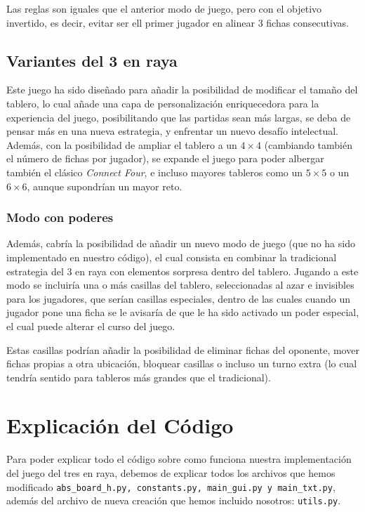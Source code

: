 \documentclass[a4paper,12pt]{article}
\begin{document}
\vspace{\baselineskip}
Las reglas son iguales que el anterior modo de juego, pero con el objetivo invertido, es decir, evitar ser ell primer jugador en alinear 3 fichas consecutivas.

\subsection{Variantes del 3 en raya}
Este juego ha sido diseñado para añadir la posibilidad de modificar el tamaño del tablero, lo cual añade una capa de personalización enriquecedora para la experiencia
del juego, posibilitando que las partidas sean más largas, se deba de pensar más en una nueva estrategia, y enfrentar un nuevo desafío intelectual.
\vspace{\baselineskip}
Además, con la posibilidad de ampliar el tablero a un $4 \times 4$ (cambiando también el número de fichas por jugador), se expande el juego para poder albergar también 
el clásico \textit{Connect Four}, e incluso mayores tableros como un $5 \times 5$ o un $6 \times 6$, aunque supondrían un mayor reto.

\subsubsection{Modo con poderes}
Además, cabría la posibilidad de añadir un nuevo modo de juego (que no ha sido implementado en nuestro código), el cual consista en combinar la tradicional estrategia
del 3 en raya con elementos sorpresa dentro del tablero. Jugando a este modo se incluiría una o más casillas del tablero, seleccionadas al azar e invisibles para los jugadores,
que serían casillas especiales, dentro de las cuales cuando un jugador pone una ficha se le avisaría de que le ha sido activado un poder especial, el cual puede alterar
el curso del juego. 

\vspace{\baselineskip}
Estas casillas podrían añadir la posibilidad de eliminar fichas del oponente, mover fichas propias a otra ubicación, bloquear casillas o incluso un turno extra (lo cual tendría 
sentido para tableros más grandes que el tradicional).

\section{Explicación del Código}
Para poder explicar todo el código sobre como funciona nuestra implementación del juego del tres en raya, debemos de explicar
todos los archivos que hemos modificado \texttt{abs\_board\_h.py, constants.py, main\_gui.py y main\_txt.py}, además del archivo 
de nueva creación que hemos incluido nosotros: \texttt{utils.py}.
\end{document}
